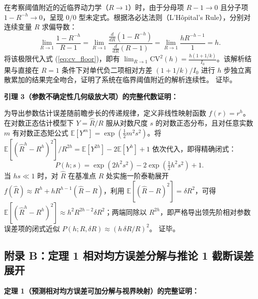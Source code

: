 \documentclass[11pt,a4paper]{article}
\theoremstyle{plain}
\theoremstyle{definition}
\begin{document}
在考察阈值附近的近临界动力学（$R \to 1$）时，由于分母项 $R - 1 \to 0$ 且分子项 $1 - R^{-h} \to 0$，呈现 $0/0$ 型未定式。根据洛必达法则（L'H\^opital's Rule），分别对连续变量 $R$ 求偏导数：
\begin{equation}
\lim_{R \to 1} \frac{1 - R^{-h}}{R - 1} = \lim_{R \to 1} \frac{\frac{d}{dR}(1 - R^{-h})}{\frac{d}{dR}(R - 1)} = \lim_{R \to 1} \frac{h R^{-h-1}}{1} = h.
\end{equation}
将该极限代入式 (\ref{eq:cv_floor})，即有 $\lim_{R \to 1} \text{CV}^2(h) = \frac{h(1 + 1/k)}{I_0}$。该解析结果与直接在 $R=1$ 条件下对单代负二项相对方差 $(1+1/k)/I_0$ 进行 $h$ 步独立离散累加的结果完全吻合，证明了系统在临界阈值附近的解析连续性。
证毕。

\vspace{0.8em}
\noindent\textbf{引理 3（参数不确定性几何级放大项）的完整代数证明：}

为导出参数估计误差随前瞻步长的传递规律，定义非线性映射函数 $f(r) = r^h$。在对数正态估计模型下 $Y = \hat{R}/R$ 服从对数尺度 $s$ 的对数正态分布，且对任意实数 $m$ 有对数正态矩公式 $\mathbb{E}[Y^m] = \exp(\tfrac{1}{2} m^2 s^2)$。将 $\mathbb{E}[(\hat{R}^h - R^h)^2]/R^{2h} = \mathbb{E}[Y^{2h}] - 2\mathbb{E}[Y^h] + 1$ 依次代入，即得精确闭式：
\begin{equation}
P(h; s) = \exp\!\left(2 h^2 s^2\right) - 2 \exp\!\left(\tfrac{1}{2} h^2 s^2\right) + 1.
\end{equation}
当 $h s \ll 1$ 时，对 $\hat{R}$ 在基准点 $R$ 处实施一阶泰勒展开 $f(\hat{R}) \approx R^h + h R^{h-1}(\hat{R}-R)$，利用 $\mathbb{E}[(\hat{R}-R)^2] = \delta R^2$，可得 $\mathbb{E}[(\hat{R}^h - R^h)^2] \approx h^2 R^{2h-2} \delta R^2$；两端同除以 $R^{2h}$，即严格导出领先阶相对参数误差项的闭式近似 $P(h; R, \delta R) \approx (h\,\delta R/R)^2$。
证毕。

\subsection*{附录 B：定理 1 相对均方误差分解与推论 1 截断误差展开}

\noindent\textbf{定理 1（预测相对均方误差可加分解与视界映射）的完整证明：}
\end{document}
